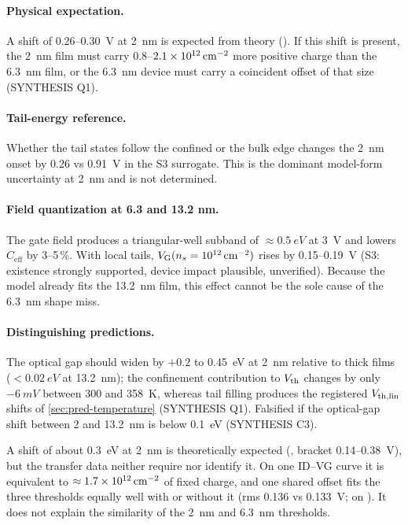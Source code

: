 \paragraph{Physical expectation.} A shift of 0.26--\SI{0.30}{V} at \SI{2}{nm} is expected from theory (\evTHEORY). If this shift is present, the \SI{2}{nm} film must carry 0.8--$2.1\times10^{12}\,\mathrm{cm}^{-2}$ more positive charge than the \SI{6.3}{nm} film, or the \SI{6.3}{nm} device must carry a coincident offset of that size (SYNTHESIS Q1).

\paragraph{Tail-energy reference.} Whether the tail states follow the confined or the bulk edge changes the \SI{2}{nm} onset by 0.26 vs \SI{0.91}{V} in the S3 surrogate. This is the dominant model-form uncertainty at \SI{2}{nm} and is not determined.

\paragraph{Field quantization at 6.3 and 13.2 nm.} The gate field produces a triangular-well subband of $\approx\SI{0.5}{eV}$ at \SI{3}{V} and lowers $C_{\mathrm{eff}}$ by 3--5\,\%. With local tails, $V_{\mathrm{G}}(n_s = 10^{12}\,\mathrm{cm}^{-2})$ rises by 0.15--\SI{0.19}{V} (S3: existence strongly supported, device impact plausible, unverified). Because the model already fits the \SI{13.2}{nm} film, this effect cannot be the sole cause of the \SI{6.3}{nm} shape miss.

\paragraph{Distinguishing predictions.} The optical gap should widen by $+0.2$ to \SI{0.45}{eV} at \SI{2}{nm} relative to thick films ($<\SI{0.02}{eV}$ at \SI{13.2}{nm}); the confinement contribution to $V_{\mathrm{th}}$ changes by only $-\SI{6}{mV}$ between 300 and \SI{358}{K}, whereas tail filling produces the registered $V_{\mathrm{th,lin}}$ shifts of \cref{sec:pred-temperature} (SYNTHESIS Q1). Falsified if the optical-gap shift between 2 and \SI{13.2}{nm} is below \SI{0.1}{eV} (SYNTHESIS C3).

\begin{keyresult}[title={Confinement: verdict}]
A shift of about \SI{0.3}{eV} at \SI{2}{nm} is theoretically expected (\evTHEORY, bracket 0.14--\SI{0.38}{V}), but the transfer data neither require nor identify it. On one ID--VG curve it is equivalent to $\approx 1.7\times10^{12}\,\mathrm{cm}^{-2}$ of fixed charge, and one shared offset fits the three thresholds equally well with or without it (rms 0.136 vs \SI{0.133}{V}; \evNUM{} on \evDATA). It does not explain the similarity of the \SI{2}{nm} and \SI{6.3}{nm} thresholds.
\end{keyresult}

